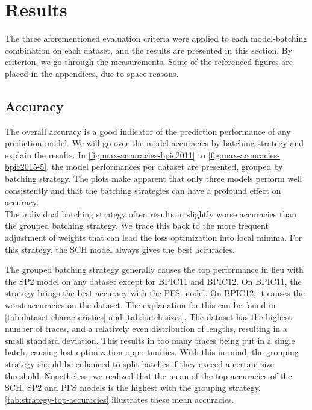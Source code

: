 \section{Results}\label{sec:eval:results}
The three aforementioned evaluation criteria were applied to each model-batching combination on each dataset, and the results are presented in this section. By criterion, we go through the measurements. Some of the referenced figures are placed in the appendices, due to space reasons.

\subsection*{Accuracy}
The overall accuracy is a good indicator of the prediction performance of any prediction model. We will go over the model accuracies by batching strategy and explain the results. In \autoref{fig:max-accuracies-bpic2011} to \autoref{fig:max-accuracies-bpic2015-5}, the model performances per dataset are presented, grouped by batching strategy. The plots make apparent that only three models perform well consistently and that the batching strategies can have a profound effect on accuracy.\\

The individual batching strategy often results in slightly worse accuracies than the grouped batching strategy. We trace this back to the more frequent adjustment of weights that can lead the loss optimization into local minima. For this strategy, the SCH model always gives the best accuracies.

The grouped batching strategy generally causes the top performance in lieu with the SP2 model on any dataset except for BPIC11 and BPIC12. On BPIC11, the strategy brings the best accuracy with the PFS model. On BPIC12, it causes the worst accuracies on the dataset. The explanation for this can be found in \autoref{tab:dataset-characteristics} and \autoref{tab:batch-sizes}. The dataset has the highest number of traces, and a relatively even distribution of lengths, resulting in a small standard deviation. This results in too many traces being put in a single batch, causing lost optimization opportunities. With this in mind, the grouping strategy should be enhanced to split batches if they exceed a certain size threshold. Nonetheless, we realized that the mean of the top accuracies of the SCH, SP2 and PFS models is the highest with the grouping strategy. \autoref{tab:strategy-top-accuracies} illustrates these mean accuracies.

